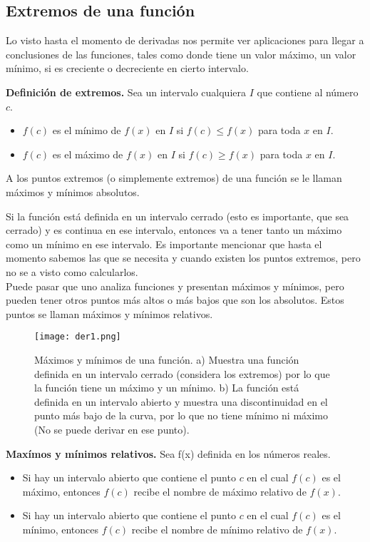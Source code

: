 \subsection{Extremos de una función}
Lo visto hasta el momento de derivadas nos permite ver aplicaciones para llegar a conclusiones de las funciones, tales como donde tiene un valor máximo, un valor mínimo, si es creciente o decreciente en cierto intervalo. 

\begin{mydef}
\textbf{Definición de extremos. } Sea un intervalo cualquiera $I$ que contiene al número $c$.
\begin{itemize}
	\item $f(c)$ es el mínimo de $f(x)$ en $I$ si $f(c)\leq f(x)$ para toda $x$ en $I$. 
	\item $f(c)$ es el máximo de $f(x)$ en $I$ si $f(c)\geq f(x)$ para toda $x$ en $I$. 
\end{itemize}
A los puntos extremos (o simplemente extremos) de una función se le llaman máximos y mínimos absolutos. 
\end{mydef}

Si la función está definida en un intervalo cerrado (esto es importante, que sea cerrado) y es continua en ese intervalo, entonces va a tener tanto un máximo como un mínimo en ese intervalo. Es importante mencionar que hasta el momento sabemos las que se necesita y cuando existen los puntos extremos, pero no se a visto como calcularlos.\\

Puede pasar que uno analiza funciones y presentan máximos y mínimos, pero pueden tener otros puntos más altos o más bajos que son los absolutos. Estos puntos se llaman máximos y mínimos relativos.

 \begin{center}
\begin{figure}[h!]
\centering
\texttt{[image: der1.png]}
\caption[Máximos y mínimos de una función.]{Máximos y mínimos de una función. a) Muestra una función definida en un intervalo cerrado (considera los extremos) por lo que la función tiene un máximo y un mínimo. b) La función está definida en un intervalo abierto y muestra una discontinuidad en el punto más bajo de la curva, por lo que no tiene mínimo ni máximo (No se puede derivar en ese punto).} \label{der1}
\end{figure}
\end{center}

\begin{mydef}
\textbf{Maxímos y mínimos relativos. } Sea f(x) definida en los números reales.

\begin{itemize}
\item  Si hay un intervalo abierto que contiene el punto $c$ en el cual $f(c)$ es el máximo, entonces $f(c)$ recibe el nombre de máximo relativo de $f(x)$.
\item Si hay un intervalo abierto que contiene el punto $c$ en el cual $f(c)$ es el mínimo, entonces $f(c)$ recibe el nombre de mínimo relativo de $f(x)$.
\end{itemize}
\end{mydef}

